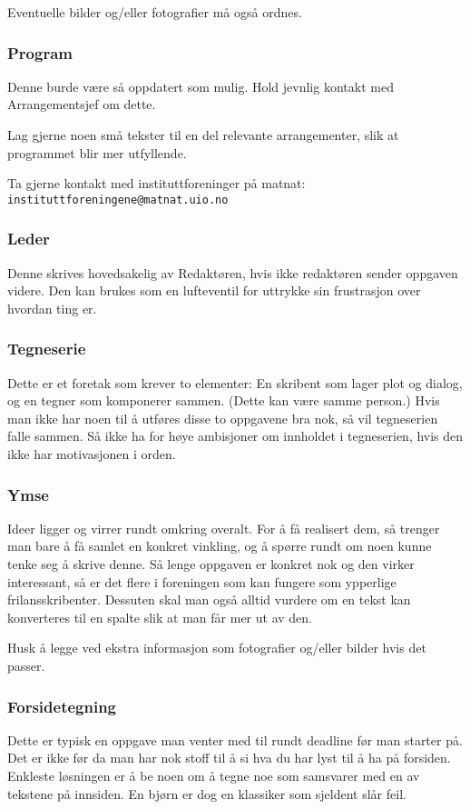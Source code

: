  Eventuelle bilder og/eller fotografier må også ordnes.

\subsubsection{Program}
 Denne burde være så oppdatert som mulig. Hold jevnlig kontakt med
Arrangementsjef om dette.

 Lag gjerne noen små tekster til en del relevante arrangementer, slik
at programmet blir mer utfyllende.

 Ta gjerne kontakt med instituttforeninger på matnat:
\verb|instituttforeningene@matnat.uio.no|

\subsubsection{Leder}
 Denne skrives hovedsakelig av Redaktøren, hvis ikke redaktøren sender
oppgaven videre. Den kan brukes som en lufteventil for uttrykke sin
frustrasjon over hvordan ting er.

\subsubsection{Tegneserie}
 Dette er et foretak som krever to elementer: En skribent som lager
plot og dialog, og en tegner som komponerer sammen. (Dette kan være
samme person.) Hvis man ikke har noen til å utføres disse to oppgavene
bra nok, så vil tegneserien falle sammen. Så ikke ha for høye
ambisjoner om innholdet i tegneserien, hvis den ikke har motivasjonen
i orden.

\subsubsection{Ymse}
 Ideer ligger og virrer rundt omkring overalt. For å få realisert dem,
så trenger man bare å få samlet en konkret vinkling, og å spørre rundt
om noen kunne tenke seg å skrive denne. Så lenge oppgaven er konkret
nok og den virker interessant, så er det flere i foreningen som kan
fungere som ypperlige frilansskribenter. Dessuten skal man også alltid
vurdere om en tekst kan konverteres til en spalte slik at man får mer
ut av den.

 Husk å legge ved ekstra informasjon som fotografier og/eller bilder
hvis det passer.

\subsubsection{Forsidetegning}
 Dette er typisk en oppgave man venter med til rundt deadline før man
starter på. Det er ikke før da man har nok stoff til å si hva du har
lyst til å ha på forsiden. Enkleste løsningen er å be noen om å tegne
noe som samsvarer med en av tekstene på innsiden. En bjørn er dog en
klassiker som sjeldent slår feil.

